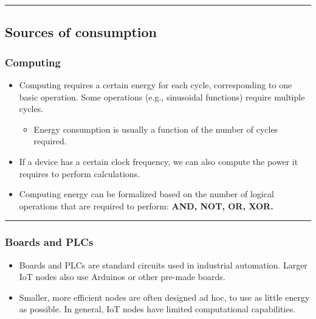 \documentclass[
]{article}
\providecommand{\tightlist}{%
  \setlength{\itemsep}{0pt}\setlength{\parskip}{0pt}}
\begin{document}
\begin{center}\rule{0.5\linewidth}{0.5pt}\end{center}

\subsection{Sources of consumption}\label{sources-of-consumption}

\subsubsection{Computing}\label{computing}

\begin{itemize}
\tightlist
\item
  Computing requires a certain energy for each cycle, corresponding to
  one basic operation. Some operations (e.g., sinusoidal functions)
  require multiple cycles.

  \begin{itemize}
  \tightlist
  \item
    Energy consumption is usually a function of the number of cycles
    required.
  \end{itemize}
\item
  If a device has a certain clock frequency, we can also compute the
  power it requires to perform calculations.
\item
  Computing energy can be formalized based on the number of logical
  operations that are required to perform: \textbf{AND, NOT, OR, XOR.}
\end{itemize}

\begin{center}\rule{0.5\linewidth}{0.5pt}\end{center}

\subsubsection{Boards and PLCs}\label{boards-and-plcs}

\begin{itemize}
\tightlist
\item
  Boards and PLCs are standard circuits used in industrial automation.
  Larger IoT nodes also use Arduinos or other pre-made boards.
\item
  Smaller, more efficient nodes are often designed ad hoc, to use as
  little energy as possible. In general, IoT nodes have limited
  computational capabilities.
\end{itemize}
\end{document}
